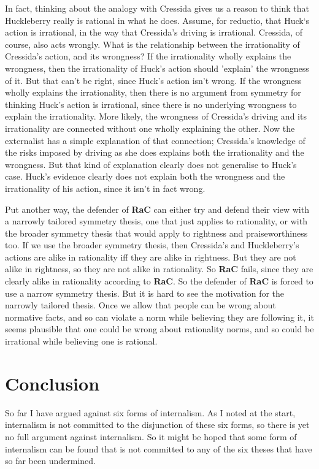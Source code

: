 \documentclass[
  10pt,
  letterpaper,
  twoside]{scrbook}
\begin{document}
In fact, thinking about the analogy with {Cressida} gives us a reason to
think that {Huck}leberry really is rational in what he does. Assume, for
reductio, that {Huck}`s action is irrational, in the way that
{Cressida}'s driving is irrational. {Cressida}, of course, also acts
wrongly. What is the relationship between the irrationality of
{Cressida}'s action, and its wrongness? If the irrationality wholly
explains the wrongness, then the irrationality of {Huck}'s action should
'explain' the wrongness of it. But that can't be right, since {Huck}'s
action isn't wrong. If the wrongness wholly explains the irrationality,
then there is no argument from symmetry for thinking {Huck}'s action is
irrational, since there is no underlying wrongness to explain the
irrationality. More likely, the wrongness of {Cressida}'s driving and
its irrationality are connected without one wholly explaining the other.
Now the externalist has a simple explanation of that connection;
{Cressida}'s knowledge of the risks imposed by driving as she does
explains both the irrationality and the wrongness. But that kind of
explanation clearly does not generalise to {Huck}'s case. {Huck}'s
evidence clearly does not explain both the wrongness and the
irrationality of his action, since it isn't in fact wrong.

Put another way, the defender of \textbf{RaC} can either try and defend
their view with a narrowly tailored symmetry thesis, one that just
applies to rationality, or with the broader symmetry thesis that would
apply to rightness and praiseworthiness too. If we use the broader
symmetry thesis, then {Cressida}'s and {Huck}leberry's actions are alike
in rationality iff they are alike in rightness. But they are not alike
in rightness, so they are not alike in rationality. So \textbf{RaC}
fails, since they are clearly alike in rationality according to
\textbf{RaC}. So the defender of \textbf{RaC} is forced to use a narrow
symmetry thesis. But it is hard to see the motivation for the narrowly
tailored thesis. Once we allow that people can be wrong about normative
facts, and so can violate a norm while believing they are following it,
it seems plausible that one could be wrong about rationality norms, and
so could be irrational while believing one is rational.

\section{Conclusion}\label{conclusion}

So far I have argued against six forms of internalism. As I noted at the
start, internalism is not committed to the disjunction of these six
forms, so there is yet no full argument against internalism. So it might
be hoped that some form of internalism can be found that is not
committed to any of the six theses that have so far been undermined.
\end{document}
